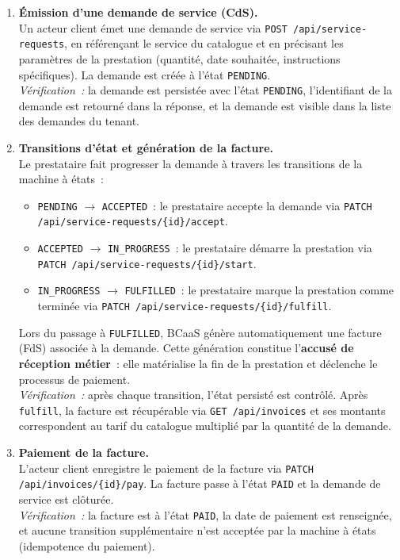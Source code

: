 \begin{enumerate}[leftmargin=*, label=\textbf{Étape \arabic*.}]
  \item \textbf{Émission d'une demande de service (CdS).}\\
    Un acteur client émet une demande de service via
    \texttt{POST /api/service-requests}, en référençant le service du catalogue et en
    précisant les paramètres de la prestation (quantité, date souhaitée, instructions
    spécifiques). La demande est créée à l'état \texttt{PENDING}.\\
    \textit{Vérification~:} la demande est persistée avec l'état \texttt{PENDING},
    l'identifiant de la demande est retourné dans la réponse, et la demande est visible
    dans la liste des demandes du tenant.

  \item \textbf{Transitions d'état et génération de la facture.}\\
    Le prestataire fait progresser la demande à travers les transitions de la machine à
    états~:
    \begin{itemize}
      \item \texttt{PENDING} $\rightarrow$ \texttt{ACCEPTED}~: le prestataire accepte la
            demande via \texttt{PATCH /api/service-requests/\{id\}/accept}.
      \item \texttt{ACCEPTED} $\rightarrow$ \texttt{IN\_PROGRESS}~: le prestataire démarre
            la prestation via \texttt{PATCH /api/service-requests/\{id\}/start}.
      \item \texttt{IN\_PROGRESS} $\rightarrow$ \texttt{FULFILLED}~: le prestataire
            marque la prestation comme terminée via
            \texttt{PATCH /api/service-requests/\{id\}/fulfill}.
    \end{itemize}
    Lors du passage à \texttt{FULFILLED}, BCaaS génère automatiquement une facture
    (FdS) associée à la demande. Cette génération constitue l'\textbf{accusé de réception
    métier}~: elle matérialise la fin de la prestation et déclenche le processus de
    paiement.\\
    \textit{Vérification~:} après chaque transition, l'état persisté est contrôlé. Après
    \texttt{fulfill}, la facture est récupérable via \texttt{GET /api/invoices} et ses
    montants correspondent au tarif du catalogue multiplié par la quantité de la demande.

  \item \textbf{Paiement de la facture.}\\
    L'acteur client enregistre le paiement de la facture via
    \texttt{PATCH /api/invoices/\{id\}/pay}. La facture passe à l'état \texttt{PAID}
    et la demande de service est clôturée.\\
    \textit{Vérification~:} la facture est à l'état \texttt{PAID}, la date de paiement
    est renseignée, et aucune transition supplémentaire n'est acceptée par la machine à
    états (idempotence du paiement).

\end{enumerate}

